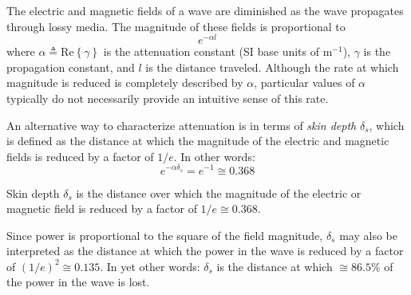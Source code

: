 

\label{m0158_Skin_Depth} %

The electric and magnetic fields of a wave are diminished as the wave propagates through lossy media.
The magnitude of these fields is proportional to
%
\begin{equation}
e^{-\alpha l} \nonumber
\end{equation}
%
where $\alpha\triangleq\mbox{Re}\left\{\gamma\right\}$ is the attenuation constant
(SI base units of m$^{-1}$), $\gamma$ is the propagation constant, and $l$ is the distance traveled.
Although the rate at which magnitude is reduced is completely described by $\alpha$, particular values of $\alpha$ typically do not necessarily provide an intuitive sense of this rate.

An alternative way to characterize attenuation is in terms of \emph{skin depth}
$\delta_s$, which is defined as the distance at which the magnitude of the electric and magnetic fields is reduced by a factor of $1/e$.  
In other words:
%
\begin{equation}
e^{-\alpha\delta_s} = e^{-1} \cong 0.368
\label{m0158_esddef}
\end{equation}
%
\begin{mdframed}[backgroundcolor=yellow!20,nobreak=true] 
Skin depth $\delta_s$ is the distance over which the magnitude of the electric or magnetic field is reduced by a factor of $1/e \cong 0.368$.
\end{mdframed}
%
Since power is proportional to the square of the field magnitude, $\delta_s$ may also be interpreted as the distance at which the power in the wave is reduced by a factor of $(1/e)^2\cong 0.135$.  
In yet other words: $\delta_s$ is the distance at which $\cong 86.5$\% of the power in the wave is lost.

